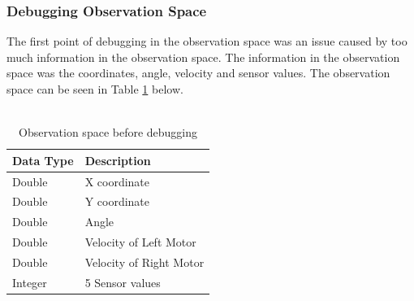 \documentclass[a4paper,12pt]{article}
\begin{document}
\subsubsection{Debugging Observation Space}
The first point of debugging in the observation space was an issue caused by too much information in the observation space. The information in the observation space was the coordinates, angle, velocity and sensor values. The observation space can be seen in Table \ref{tab:Observation space before debugging} below.
\\\\
\begin{table}[H]
\label{table:ObsBeforeDebuggin}
\centering
\caption{Observation space before debugging}
\label{tab:Observation space before debugging}
\begin{tabular}{|ll|}
\hline
\textbf{Data Type} & \textbf{Description}\\ \hline
Double & X coordinate \\ 
Double & Y coordinate \\ 
Double & Angle\\ 
Double & Velocity of Left Motor \\ 
Double & Velocity of Right Motor \\ 
Integer & 5 Sensor values \\ \hline
\end{tabular}
\end{table}
\end{document}
